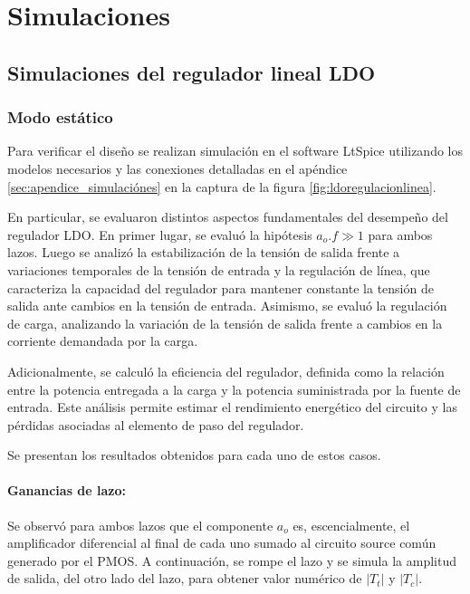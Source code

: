 \documentclass[]{article}
\newif\ifcheckpoint
\newcommand{\checkpointcolor}[1]{%
	\ifcase#1
	yellow%
	\or blue%
	\or green%
	\or red%
	\or orange%
	\else gray%
	\fi
}
\newcommand{\checkpointstart}[1]{%
	\ifcheckpoint
	\edef\tempcolor{\checkpointcolor{#1}}%
	\begin{tcolorbox}[
		colback=\tempcolor!15,
		colframe=\tempcolor!60!black,
		boxrule=0pt,
		arc=0pt,
		width=\textwidth
		]
		\textbf{Inicio checkpoint #1}
	\end{tcolorbox}
	\fi
}
\begin{document}
	\section{Simulaciones}
	\label{sec:simulaciones}
	
	\subsection{Simulaciones del regulador lineal LDO}
	\FloatBarrier
	\FloatBarrier
	\subsubsection{Modo estático}
	\FloatBarrier
	
	Para verificar el diseño se realizan simulación en el software LtSpice utilizando los modelos necesarios y las conexiones detalladas en el apéndice \ref{sec:apendice_simulaciónes} en la captura de la figura \ref{fig:ldoregulacionlinea}.
	
	En particular, se evaluaron distintos aspectos fundamentales del desempeño del regulador LDO. En primer lugar, se evaluó la hipótesis $a_o.f \gg 1$ para ambos lazos. Luego se analizó la estabilización de la tensión de salida frente a variaciones temporales de la tensión de entrada y la regulación de línea, que caracteriza la capacidad del regulador para mantener constante la tensión de salida ante cambios en la tensión de entrada. Asimismo, se evaluó la regulación de carga, analizando la variación de la tensión de salida frente a cambios en la corriente demandada por la carga.
	
	Adicionalmente, se calculó la eficiencia del regulador, definida como la relación entre la potencia entregada a la carga y la potencia suministrada por la fuente de entrada. Este análisis permite estimar el rendimiento energético del circuito y las pérdidas asociadas al elemento de paso del regulador.
	
	Se presentan los resultados obtenidos para cada uno de estos casos.
	
	\checkpointstart{2}
	\FloatBarrier
	\paragraph{Ganancias de lazo: }
	\FloatBarrier
	Se observó para ambos lazos que el componente $a_o$ es, escencialmente, el amplificador diferencial al final de cada uno sumado al circuito source común generado por el PMOS. A continuación, se rompe el lazo y se simula la amplitud de salida, del otro lado del lazo, para obtener valor numérico de $|T_t|$ y $|T_c|$.
	
\end{document}
